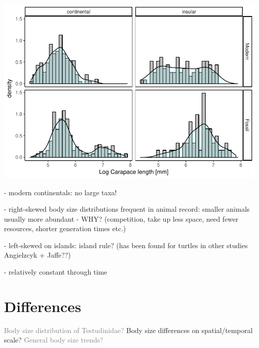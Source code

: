 \begin{frame}
\includegraphics[scale=0.45]{MA_JJ_files/figure-latex/HistFMCI-1.pdf}

- modern continentals: no large taxa!
\end{frame}

\begin{frame}
- right-skewed body size distributions frequent in animal record: smaller animals usually more abundant - WHY? (competition, take up less space, need fewer resources, shorter generation times etc.)

- left-skewed on islands: island rule?
(has been found for turtles in other studies \pf Angielzcyk + Jaffe??)

- relatively constant through time
\end{frame}




\section{Differences}


\begin{frame}
\begin{enumerate}
	
	\p \textcolor{gray}{Body size distribution of Testudinidae?}
	\bigskip
	\p Body size differences on spatial/temporal scale?
	\bigskip
	\p \textcolor{gray}{General body size trends?}
\end{enumerate}
\end{frame}



